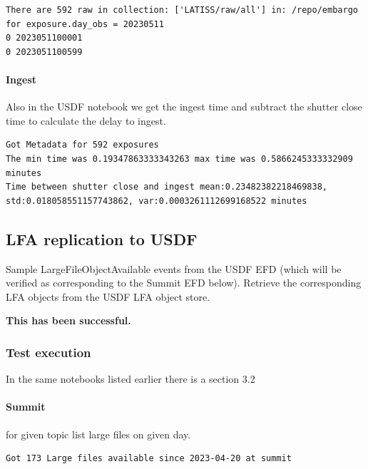 \begin{lstlisting}
There are 592 raw in collection: ['LATISS/raw/all'] in: /repo/embargo for exposure.day_obs = 20230511
0 2023051100001
0 2023051100599
\end{lstlisting}

\paragraph {Ingest} \label{sec:ingest}
Also in the USDF notebook we get the ingest time and subtract the shutter close time to calculate the
delay to ingest.
\begin{lstlisting}
Got Metadata for 592 exposures
The min time was 0.19347863333343263 max time was 0.5866245333332909 minutes
Time between shutter close and ingest mean:0.23482382218469838, std:0.018058551157743862, var:0.0003261112699168522 minutes
\end{lstlisting}

\subsection{LFA replication to USDF }
Sample LargeFileObjectAvailable events from the USDF EFD (which will be verified as corresponding to the Summit EFD below).
Retrieve the corresponding LFA objects from the USDF LFA object store.

\textbf{This has been successful.}
\subsubsection{Test execution}
In the same notebooks  listed earlier there is a section 3.2

\paragraph{Summit} for given topic list large files on given day.
\begin{lstlisting}
Got 173 Large files available since 2023-04-20 at summit
\end{lstlisting}

